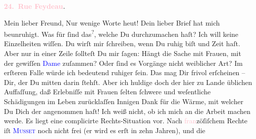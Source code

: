            \pstart
           \begin{otherlanguage}{french}\textcolor{gray}{\textbf{\textbf{\textcolor{pink}{24. Rue Feydeau}{}\ledrightnote{\textcolor{pink}{rue Feydeau}}.}}}\end{otherlanguage}\pend
           \pstart\center{}Mein lieber Freund,\pend\pstart
           Nur wenige Worte heut!\pend
           \pstart
           Dein lieber Brief hat mich beunruhigt. Was für \label{K_L02801-1v}\label{K_L02801-1h} ſind das\substVorne{}\textsuperscript{?}\substDazwischen{},\substHinten{} welche Du durchzumachen haſt?\pend
           \pstart
           Ich will keine Einzelheiten wiſſen. Du wirſt mir ſchreiben, wenn Du ruhig biſt und
               Zeit haſt. Aber nur in einer Zeile ſollteſt Du mir ſagen: Hängt die Sache mit Frauen,
               mit der gewiſſen \textcolor{blue}{Dame}{}
               zuſammen? Oder ſind es Vorgänge nicht weiblicher Art? Im erſteren Falle würde ich
               bedeutend ruhiger \strikeout{\textcolor{gray}{ſa}} ſein. Das mag Dir frivol erſcheinen – Dir, der Du mitten darin ſtehſt. Aber
               ich {\pb}huldige doch der hier zu Lande üblichen
                  Auffaſſung\strikeout{:}\introOben{},\introOben{} daß Erlebniſſe mit Frauen ſelten ſchwere und weſentliche
               Schädigungen im Leben zurücklaſſen{\dotsfour}\pend
           \pstart
           Innigen Dank für die Wärme, mit welcher Du Dich der \label{K_L02801-2v}\label{K_L02801-2h} angenommen haſt! Ich weiß nicht, ob ich mich an die Arbeit machen werde. Es
               liegt eine complicirte Rechts-Situation vor. Nach \textcolor{pink}{fran}{}zöſiſchem Rechte iſt \textsc{\textcolor{blue}{Musset}{}\ledrightnote{\textcolor{blue}{Alfred de Musset}}} noch nicht frei (er wird es erſt in zehn Jahren), und die \label{K_L02801-5v}\label{K_L02801-5h}
